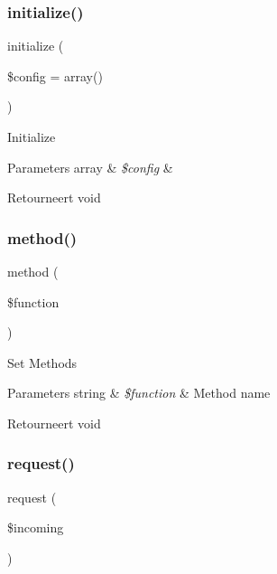 \subsubsection{\texorpdfstring{initialize()}{initialize()}}
{\footnotesize\ttfamily initialize (\begin{DoxyParamCaption}\item[{}]{\$config = {\ttfamily array()} }\end{DoxyParamCaption})}

Initialize


\begin{DoxyParams}[1]{Parameters}
array & {\em \$config} & \\
\hline
\end{DoxyParams}
\begin{DoxyReturn}{Retourneert}
void 
\end{DoxyReturn}
\mbox{\label{class_c_i___xmlrpc_a3d7e090549ec52eba8cf65598eefa72c}} 
\subsubsection{\texorpdfstring{method()}{method()}}
{\footnotesize\ttfamily method (\begin{DoxyParamCaption}\item[{}]{\$function }\end{DoxyParamCaption})}

Set Methods


\begin{DoxyParams}[1]{Parameters}
string & {\em \$function} & Method name \\
\hline
\end{DoxyParams}
\begin{DoxyReturn}{Retourneert}
void 
\end{DoxyReturn}
\mbox{\label{class_c_i___xmlrpc_a10d4ec842c61f2301ecccc900500e4c8}} 
\subsubsection{\texorpdfstring{request()}{request()}}
{\footnotesize\ttfamily request (\begin{DoxyParamCaption}\item[{}]{\$incoming }\end{DoxyParamCaption})}

